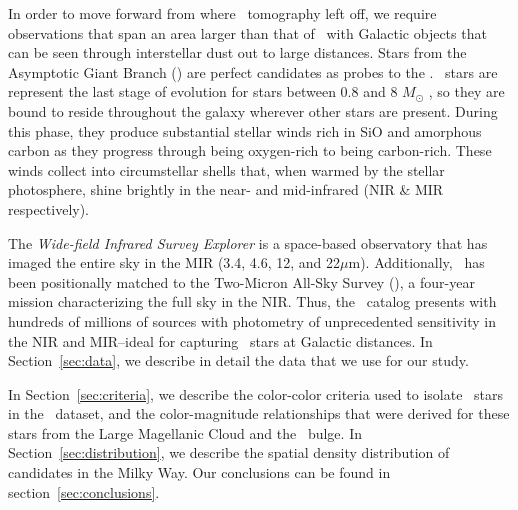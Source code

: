 In order to move forward from where \sdss\, tomography left off, we require observations that span an area larger than that of \sdss\, with Galactic objects that can be seen through interstellar dust out to large distances. Stars from the Asymptotic Giant Branch (\agb) are perfect candidates as probes to the \mw. \agb\, stars are represent the last stage of evolution for stars between 0.8 and 8 $M_\odot$ \citep{1983ARA&A..21..271I, 2005ARA&A..43..435H}, so they are bound to reside throughout the galaxy wherever other stars are present. During this phase, they produce substantial stellar winds \citep[$10^{-7} < \dot{M} < 10^{-4} M_\odot$ yr$^{-1}$,][]{2002A&A...391.1053O} rich in SiO and amorphous carbon as they progress through being oxygen-rich to being carbon-rich. These winds collect into circumstellar shells that, when warmed by the stellar photosphere, shine brightly in the near- and mid-infrared (NIR \& MIR respectively). 

The \emph{Wide-field Infrared Survey Explorer} \citep[\wise, ][]{2010AJ....140.1868W, 2012wise.rept....1C} is a space-based observatory that has imaged the entire sky in the MIR (3.4, 4.6, 12, and 22$\mu$m). Additionally, \wise\, has been positionally matched to the Two-Micron All-Sky Survey (\twomass), a four-year mission characterizing the full sky in the NIR. Thus, the \wise\, catalog presents with hundreds of millions of sources with photometry of unprecedented sensitivity in the NIR and MIR--ideal for capturing \agb\, stars at Galactic distances. In Section~\ref{sec:data}, we describe in detail the data that we use for our study. 

In Section~\ref{sec:criteria}, we describe the color-color criteria used to isolate \agb\, stars in the \wise\, dataset, and the color-magnitude relationships that were derived for these stars from the Large Magellanic Cloud and the \mw\, bulge.
In Section~\ref{sec:distribution}, we describe the spatial density distribution of \agb\, candidates in the Milky Way.
Our conclusions can be found in section~\ref{sec:conclusions}.

